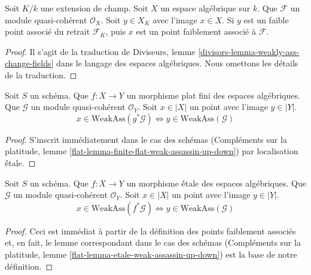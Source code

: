 \begin{lemma}
\label{lemma-weakly-ass-change-fields}
Soit $K/k$ une extension de champ. Soit $X$ un espace algébrique sur $k$.
Que $\mathcal{F}$ un module quasi-cohérent $\mathcal{O}_X$.
Soit $y \in X_K$ avec l'image $x \in X$. Si $y$ est un faible
point associé du retrait $\mathcal{F}_K$, puis $x$
est un point faiblement associé à $\mathcal{F}$.
\end{lemma}

\begin{proof}
Il s'agit de la traduction de
Diviseurs, lemme \ref{divisors-lemma-weakly-ass-change-fields}
dans le langage des espaces algébriques. Nous omettons les détails de la
traduction.
\end{proof}

\begin{lemma}
\label{lemma-finite-flat-weak-assassin-up-down}
Soit $S$ un schéma.
Que $f : X \to Y$ un morphisme plat fini des espaces algébriques.
Que $\mathcal{G}$ un module quasi-cohérent $\mathcal{O}_Y$.
Soit $x \in |X|$ un point avec l'image $y \in |Y|$.
$$
x \in \text{WeakAss}(g^*\mathcal{G})
\Leftrightarrow
y \in \text{WeakAss}(\mathcal{G})
$$
\end{lemma}

\begin{proof}
S'inscrit immédiatement dans le cas des schémas
(Compléments sur la platitude, lemme \ref{flat-lemma-finite-flat-weak-assassin-up-down})
par localisation \'étale.
\end{proof}

\begin{lemma}
\label{lemma-etale-weak-assassin-up-down}
Soit $S$ un schéma.
Que $f : X \to Y$ un morphisme \'étale des espaces algébriques.
Que $\mathcal{G}$ un module quasi-cohérent $\mathcal{O}_Y$.
Soit $x \in |X|$ un point avec l'image $y \in |Y|$.
$$
x \in \text{WeakAss}(f^*\mathcal{G})
\Leftrightarrow
y \in \text{WeakAss}(\mathcal{G})
$$
\end{lemma}

\begin{proof}
Ceci est immédiat à partir de la définition des points faiblement associés
et, en fait, le lemme correspondant dans le cas des schémas
(Compléments sur la platitude, lemme \ref{flat-lemma-etale-weak-assassin-up-down})
est la base de notre définition.
\end{proof}







